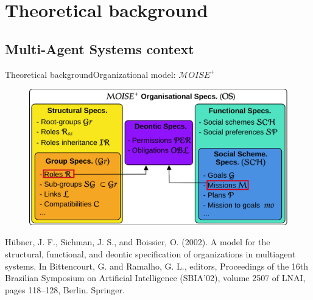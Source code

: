 

\section{Theoretical background}

\subsection{Multi-Agent Systems context}

\begin{frame}{Theoretical background}{Organizational model: $\mathcal{M}OISE^+$}

    \begin{figure}
        \centering
        \includegraphics[width=0.75\linewidth]{figures/moise_model.png}
    \end{figure}

    \begin{spacing}{0.25}
        {\tiny Hübner, J. F., Sichman, J. S., and Boissier, O. (2002).
            A model for the structural, functional, and deontic specification of
            organizations in multiagent systems.
            In Bittencourt, G. and Ramalho, G. L., editors, Proceedings of the 16th Brazilian Symposium on Artificial Intelligence (SBIA’02), volume 2507 of LNAI, pages 118–128, Berlin. Springer.}
    \end{spacing}

\end{frame}


